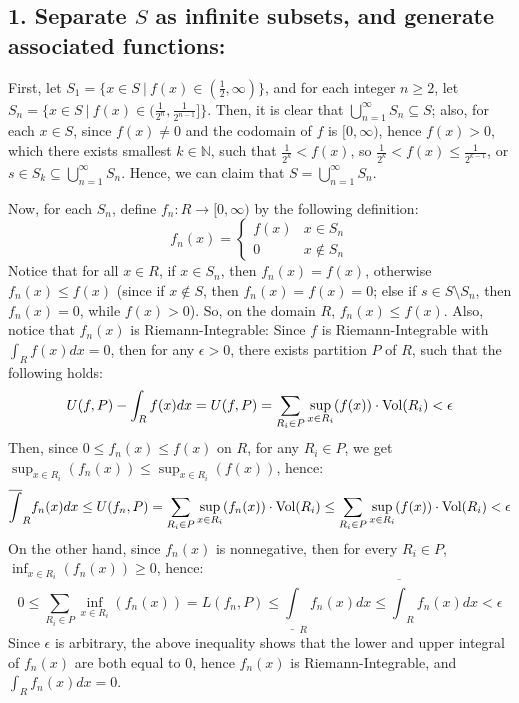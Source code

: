 \documentclass{article}
\begin{document}
\subsection*{1. Separate $S$ as infinite subsets, and generate associated functions:}
First, let $S_1 = \{x\in S\ |\ f(x)\in (\frac{1}{2},\infty)\}$, and for each integer $n\geq 2$, let $S_n=\{x\in S\ |\ f(x)\in (\frac{1}{2^n},\frac{1}{2^{n-1}}]\}$. Then, it is clear that $\bigcup_{n=1}^{\infty}S_n\subseteq S$; also, for each $x\in S$, since $f(x)\neq 0$ and the codomain of $f$ is $[0,\infty)$, hence $f(x)>0$, which there exists smallest $k\in\mathbb{N}$, such that $\frac{1}{2^k}<f(x)$, so $\frac{1}{2^k}<f(x)\leq \frac{1}{2^{k-1}}$, or $s\in S_k\subseteq \bigcup_{n=1}^{\infty}S_n$. Hence, we can claim that $S=\bigcup_{n=1}^{\infty}S_n$.

Now, for each $S_n$, define $f_n:R\rightarrow[0,\infty)$ by the following definition:
\begin{equation}
    f_n(x)=\begin{cases}
        f(x) & x\in S_n\\
        0 & x\notin S_n
    \end{cases}
\end{equation}
Notice that for all $x\in R$, if $x\in S_n$, then $f_n(x)=f(x)$, otherwise $f_n(x)\leq f(x)$ (since if $x\notin S$, then $f_n(x)=f(x)=0$; else if $s\in S\setminus S_n$, then $f_n(x)=0$, while $f(x)>0$). So, on the domain $R$, $f_n(x)\leq f(x)$.
Also, notice that $f_n(x)$ is Riemann-Integrable: Since $f$ is Riemann-Integrable with $\int_Rf(x)dx = 0$, then for any $\epsilon>0$, there exists partition $P$ of $R$, such that the following holds:
\begin{equation}
    U(f,P) - \int_Rf(x)dx = U(f,P) = \sum_{R_i\in P}\sup_{x\in R_i}(f(x))\cdot \textmd{Vol}(R_i)<\epsilon
\end{equation}
Then, since $0\leq f_n(x)\leq f(x)$ on $R$, for any $R_i\in P$, we get $\sup_{x\in R_i}(f_n(x))\leq \sup_{x\in R_i}(f(x))$, hence:
\begin{equation}
    \overline{\int}_{R}f_n(x)dx \leq U(f_n,P) = \sum_{R_i\in P}\sup_{x\in R_i}(f_n(x))\cdot \textmd{Vol}(R_i) \leq \sum_{R_i\in P}\sup_{x\in R_i}(f(x))\cdot \textmd{Vol}(R_i)<\epsilon
\end{equation}
On the other hand, since $f_n(x)$ is nonnegative, then for every $R_i\in P$, $\inf_{x\in R_i}(f_n(x))\geq 0$, hence:
\begin{equation}
    0\leq \sum_{R_i\in P}\inf_{x\in R_i}(f_n(x)) = L(f_n,P) \leq \underline{\int}_{R}f_n(x)dx \leq \overline{\int}_Rf_n(x)dx < \epsilon
\end{equation}
Since $\epsilon$ is arbitrary, the above inequality shows that the lower and upper integral of $f_n(x)$ are both equal to $0$, hence $f_n(x)$ is Riemann-Integrable, and $\int_Rf_n(x)dx = 0$.
\end{document}
